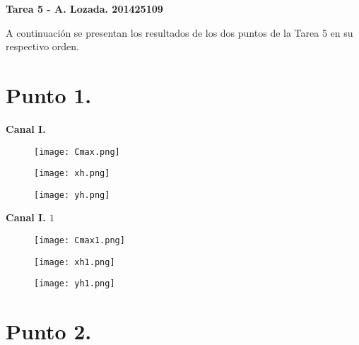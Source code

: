 \documentclass[12pt,letterpaper]{article}
\begin{document}
\begin{center}
{\textbf{Tarea 5 - A. Lozada. 201425109}}\\
\vspace{0.2cm}
\end{center}
A continuación se presentan los resultados de los dos puntos de la Tarea 5 en su respectivo orden. 

\section{Punto 1.}
\vspace{0.05cm}

\begin{center}
{\textbf{Canal I.}}\\
\vspace{0.1cm}
\end{center}

\begin{figure}[H]
\texttt{[image: Cmax.png]}
\centering
\end{figure}

\begin{figure}[H]
\texttt{[image: xh.png]}
\centering
\end{figure}

\begin{figure}[H]
\texttt{[image: yh.png]}
\centering
\end{figure}


\begin{center}
{\textbf{Canal I. $1$}}\\
\vspace{0.1cm}
\end{center}

\begin{figure}[H]
\texttt{[image: Cmax1.png]}
\centering
\end{figure}


\begin{figure}[H]
\texttt{[image: xh1.png]}
\centering
\end{figure}


\begin{figure}[H]
\texttt{[image: yh1.png]}
\centering
\end{figure}



\section{Punto 2.}
\vspace{0.2cm}
\end{document}
